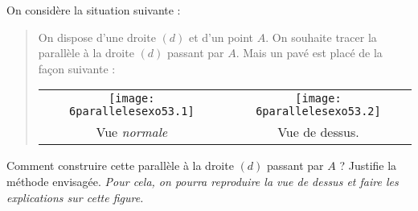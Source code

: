 On considère la situation suivante :
\begin{quote}
  On dispose d'une droite $(d)$ et d'un point $A$. On souhaite tracer
  la parallèle à la droite $(d)$ passant par $A$. Mais un pavé est
  placé de la façon suivante :
\par
\begin{tabular}{cc}
\texttt{[image: 6parallelesexo53.1]}&\texttt{[image: 6parallelesexo53.2]}\\
Vue {\em normale}&Vue de dessus.
\end{tabular}
\end{quote}
Comment construire cette parallèle à la droite $(d)$ passant par $A$ ?
Justifie la méthode envisagée. {\em Pour cela, on pourra reproduire la
  vue de dessus et faire les explications sur cette figure.}